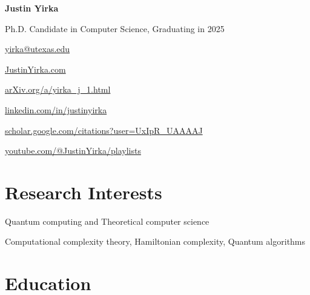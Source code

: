 \documentclass[11pt,letterpaper,serif]{moderncv}
\begin{document}
\pagestyle{normal}


\thispagestyle{firstpage}

\begin{center}
	{\LARGE\textbf{Justin Yirka}}

	\smallskip{}

	Ph.D. Candidate in Computer Science, Graduating in 2025

	\medskip{}

	\href{mailto:yirka@utexas.edu}{yirka@utexas.edu}

	\medskip{}

	\href{https://www.justinyirka.com}{JustinYirka.com}


	\href{https://arxiv.org/a/yirka_j_1.html}{arXiv.org/a/yirka\_j\_1.html}

	\faLinkedin{} \href{https://www.linkedin.com/in/justinyirka/}{linkedin.com/in/justinyirka}

	\faGraduationCap{} \href{https://scholar.google.com/citations?user=UxIpR_UAAAAJ}{scholar.google.com/citations?user=UxIpR\_UAAAAJ}

	\faYoutube{}
	\href{https://www.youtube.com/playlist?list=PLHxZKg_X23Knp1fhJJI2u9HZP39uhbr7O}{youtube.com/@JustinYirka/playlists}
\end{center}


\setlength{\parskip}{0em}

\section{Research Interests}
Quantum computing and Theoretical computer science

\qquad Computational complexity theory, Hamiltonian complexity, Quantum algorithms


\section{Education}
\end{document}

